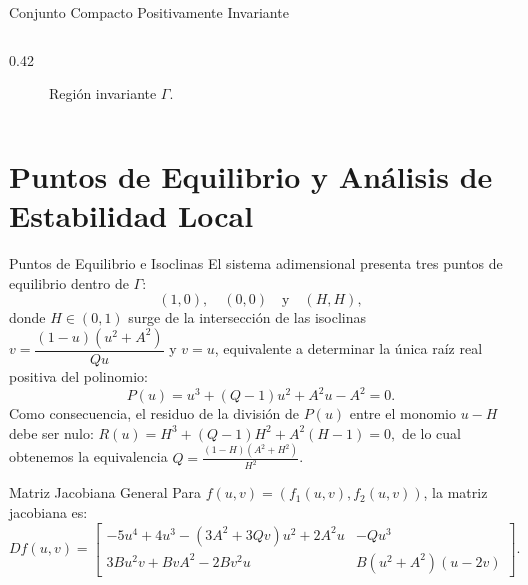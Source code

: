 \documentclass[10pt, aspectratio=169]{beamer}
\begin{document}
\begin{frame}{Conjunto Compacto Positivamente Invariante}
\begin{columns}
\begin{column}{0.42\textwidth}
\begin{figure}
					\caption{ Región invariante $\Gamma$.}
				\end{figure}
			\end{column}
		\end{columns}
	\end{frame}
	
	\section{Puntos de Equilibrio y Análisis de Estabilidad Local}
	
	\begin{frame}{Puntos de Equilibrio e Isoclinas}
		El sistema adimensional presenta tres puntos de equilibrio dentro de $\Gamma$:
		\begin{equation*}
			(1,0), \quad (0,0) \quad \text{y} \quad (H,H),
		\end{equation*}
		donde $H \in (0,1)$ surge de la intersección de las isoclinas $v = \dfrac{(1-u)(u^2+A^2)}{Q u}$ y $v = u$, equivalente a determinar la única raíz real positiva del polinomio:
		\begin{equation*}
			P(u) = u^3 + (Q-1)u^2 + A^2 u - A^2 = 0.
		\end{equation*}
		Como consecuencia, el residuo de la división de $P(u)$ entre el monomio $u - H$ debe ser nulo: $R(u) = H^{3}+(Q-1)H^{2}+A^{2}(H-1) = 0,$ de lo cual obtenemos la equivalencia $Q = \frac{(1-H)(A^2+H^2)}{H^2}$.
		\begin{block}{Matriz Jacobiana General}
			Para $f(u,v) = (f_1(u,v), f_2(u,v))$, la matriz jacobiana es:
			\begin{equation*}
				Df(u,v) = \begin{bmatrix}
					-5u^4 + 4u^3 - (3A^2 + 3Qv)u^2 + 2A^2u & -Qu^3 \\
					3Bu^2v + BvA^2 - 2Bv^2u & B(u^2+A^2)(u-2v)
				\end{bmatrix}.
			\end{equation*}
		\end{block}
	\end{frame}
	
\end{document}
